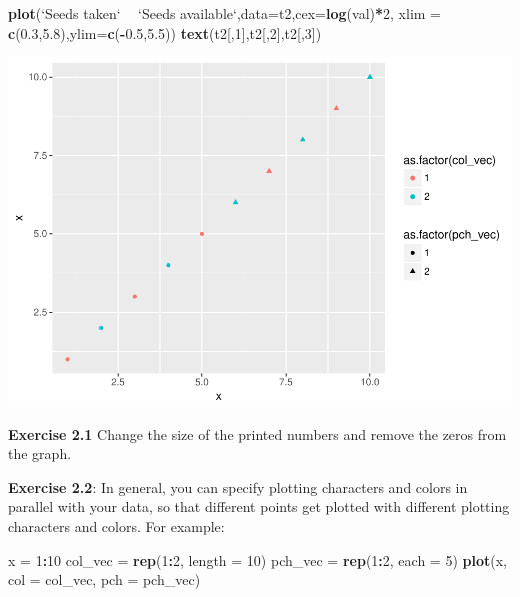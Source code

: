 \documentclass[11pt,]{article}
\newenvironment{Shaded}{\begin{snugshade}}{\end{snugshade}}
\newcommand{\KeywordTok}[1]{\textcolor[rgb]{0.13,0.29,0.53}{\textbf{#1}}}
\newcommand{\DataTypeTok}[1]{\textcolor[rgb]{0.13,0.29,0.53}{#1}}
\newcommand{\DecValTok}[1]{\textcolor[rgb]{0.00,0.00,0.81}{#1}}
\newcommand{\FloatTok}[1]{\textcolor[rgb]{0.00,0.00,0.81}{#1}}
\newcommand{\StringTok}[1]{\textcolor[rgb]{0.31,0.60,0.02}{#1}}
\newcommand{\OperatorTok}[1]{\textcolor[rgb]{0.81,0.36,0.00}{\textbf{#1}}}
\newcommand{\NormalTok}[1]{#1}
\begin{document}
\begin{Shaded}
\begin{Highlighting}[]
\KeywordTok{plot}\NormalTok{(}\StringTok{`}\DataTypeTok{Seeds taken}\StringTok{`} \OperatorTok{~}\StringTok{ `}\DataTypeTok{Seeds available}\StringTok{`}\NormalTok{,}\DataTypeTok{data=}\NormalTok{t2,}\DataTypeTok{cex=}\KeywordTok{log}\NormalTok{(val)}\OperatorTok{*}\DecValTok{2}\NormalTok{,}
        \DataTypeTok{xlim =} \KeywordTok{c}\NormalTok{(}\FloatTok{0.3}\NormalTok{,}\FloatTok{5.8}\NormalTok{),}\DataTypeTok{ylim=}\KeywordTok{c}\NormalTok{(}\OperatorTok{-}\FloatTok{0.5}\NormalTok{,}\FloatTok{5.5}\NormalTok{))}
\KeywordTok{text}\NormalTok{(t2[,}\DecValTok{1}\NormalTok{],t2[,}\DecValTok{2}\NormalTok{],t2[,}\DecValTok{3}\NormalTok{])}
\end{Highlighting}
\end{Shaded}

\includegraphics{Lab_2_modified_files/figure-latex/unnamed-chunk-42-1.pdf}

\textbf{Exercise 2.1} Change the size of the printed numbers and remove
the zeros from the graph.

\textbf{Exercise 2.2}: In general, you can specify plotting characters
and colors in parallel with your data, so that different points get
plotted with different plotting characters and colors. For example:

\begin{Shaded}
\begin{Highlighting}[]
\NormalTok{x =}\StringTok{ }\DecValTok{1}\OperatorTok{:}\DecValTok{10}
\NormalTok{col_vec =}\StringTok{ }\KeywordTok{rep}\NormalTok{(}\DecValTok{1}\OperatorTok{:}\DecValTok{2}\NormalTok{, }\DataTypeTok{length =} \DecValTok{10}\NormalTok{)}
\NormalTok{pch_vec =}\StringTok{ }\KeywordTok{rep}\NormalTok{(}\DecValTok{1}\OperatorTok{:}\DecValTok{2}\NormalTok{, }\DataTypeTok{each =} \DecValTok{5}\NormalTok{)}
\KeywordTok{plot}\NormalTok{(x, }\DataTypeTok{col =}\NormalTok{ col_vec, }\DataTypeTok{pch =}\NormalTok{ pch_vec)}
\end{Highlighting}
\end{Shaded}
\end{document}
